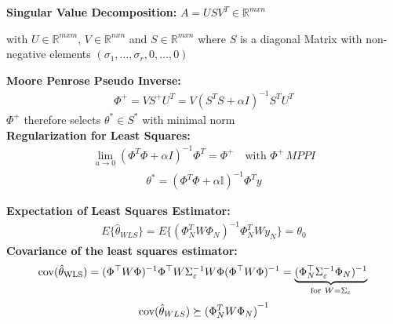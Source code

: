 \begin{tcolorbox}[colback=red!5!white,colframe=red!75!black,title=\textbf{Ill-Posed Least Squares}]	
\textbf{Singular Value Decomposition: } $A = USV^T \in\mathbb R^{mxn} $
\begin{addmargin}[1em]{0em}
	with $U\in\mathbb R^{mxm}$, $V\in\mathbb R^{nxn}$ and $S\in\mathbb R^{mxn}$ where $S$ is a diagonal Matrix with non-negative elements $(\sigma_1,\dots,\sigma_r, 0,\dots,0)$\\
\end{addmargin}
\textbf{Moore Penrose Pseudo Inverse: }
\begin{align*}
	\Phi^+ = VS^+ U^T = V(S^T S+\alpha I)^{-1} S^T U^T
\end{align*}
\hspace{1em} $\Phi^+$ therefore selects $\theta^* \in S^*$ with minimal norm \\
\textbf{Regularization for Least Squares:}
\begin{align*}
	\underset{a \rightarrow 0}{\lim} (\Phi^T \Phi + \alpha I)^{-1} \Phi^T = \Phi^+ \quad \text{with }\Phi^+ \, MPPI 
\end{align*}
\begin{align*}
\theta^* = (\Phi^T \Phi + \alpha \mathbb{I})^{-1} \Phi^T y
\end{align*}
\end{tcolorbox}

\begin{tcolorbox}[colback=red!5!white,colframe=red!75!black,title=\textbf{Statistical Analysis of WLS}]
\textbf{Expectation of Least Squares Estimator: }
\begin{align*}
	E \{\hat \theta_{WLS} \} = E \{ {(\Phi_{N}^{T} W \Phi_N)}^{-1} \Phi_{N}^{T} W y_N \} = \theta_0
\end{align*}
\textbf{Covariance of the least squares estimator: }
\begin{equation*}
	\cov(\ti{\hat{\theta}}{WLS})=(\Phi\trans W\Phi)\inv \Phi\trans W\Sigma\inv_\varepsilon W\Phi(\Phi\trans W\Phi)\inv =
	\underbrace{(\Phi\trans_N\Sigma\inv_{\varepsilon}\Phi_N)\inv}_{\mathrm{for\ }W=\Sigma_\varepsilon}\\
  \end{equation*}
  \begin{equation*}
	\mathrm{cov}(\hat \theta_{WLS}) \succeq {(\Phi_{N}^{T} W \Phi_{N})}^{-1}
\end{equation*}
\end{tcolorbox}

